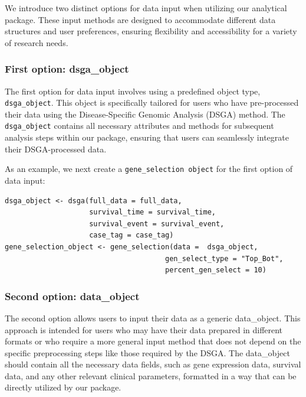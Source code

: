 We introduce two distinct options for data input when utilizing our analytical package. These input methods are designed to accommodate different data structures and user preferences, ensuring flexibility and accessibility for a variety of research needs.

\hypertarget{first-option-dsga_object}{%
\subsubsection{First option: dsga\_object}\label{first-option-dsga_object}}

The first option for data input involves using a predefined object type, \texttt{dsga\_object}. This object is specifically tailored for users who have pre-processed their data using the Disease-Specific Genomic Analysis (DSGA) method. The \texttt{dsga\_object} contains all necessary attributes and methods for subsequent analysis steps within our package, ensuring that users can seamlessly integrate their DSGA-processed data.

As an example, we next create a \texttt{gene\_selection\ object} for the first option of data input:

\begin{verbatim}
dsga_object <- dsga(full_data = full_data,
                    survival_time = survival_time,
                    survival_event = survival_event, 
                    case_tag = case_tag)
gene_selection_object <- gene_selection(data =  dsga_object,
                                      gen_select_type = "Top_Bot", 
                                      percent_gen_select = 10)
\end{verbatim}

\hypertarget{second-option-data_object}{%
\subsubsection{Second option: data\_object}\label{second-option-data_object}}

The second option allows users to input their data as a generic data\_object. This approach is intended for users who may have their data prepared in different formats or who require a more general input method that does not depend on the specific preprocessing steps like those required by the DSGA. The data\_object should contain all the necessary data fields, such as gene expression data, survival data, and any other relevant clinical parameters, formatted in a way that can be directly utilized by our package.

